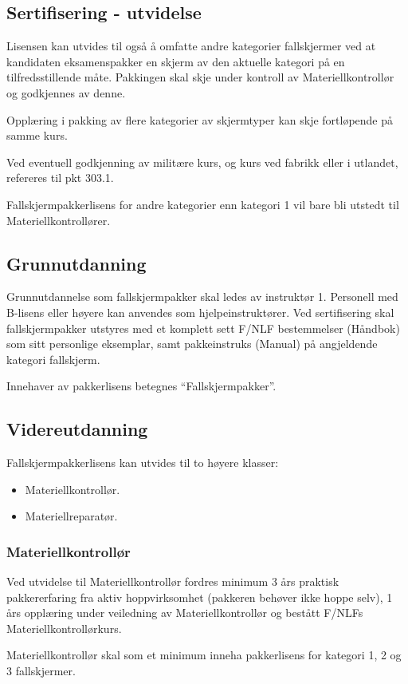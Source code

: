 \subsection{Sertifisering - utvidelse}
Lisensen kan utvides til også å omfatte andre kategorier fallskjermer ved at kandidaten eksamenspakker en skjerm av den aktuelle kategori på en tilfredsstillende måte. Pakkingen skal skje under kontroll av Materiellkontrollør og godkjennes av denne.

Opplæring i pakking av flere kategorier av skjermtyper kan skje fortløpende på samme kurs.

Ved eventuell godkjenning av militære kurs, og kurs ved fabrikk eller i utlandet, refereres til pkt 303.1.

Fallskjermpakkerlisens for andre kategorier enn kategori 1 vil bare bli utstedt til Materiellkontrollører.

\subsection{Grunnutdanning}
Grunnutdannelse som fallskjermpakker skal ledes av instruktør 1. Personell med B-lisens eller høyere kan anvendes som hjelpeinstruktører. Ved sertifisering skal fallskjermpakker utstyres med et komplett sett F/NLF bestemmelser (Håndbok) som sitt personlige eksemplar, samt pakkeinstruks (Manual) på angjeldende kategori fallskjerm.

Innehaver av pakkerlisens betegnes ``Fallskjermpakker''.

\subsection{Videreutdanning}
Fallskjermpakkerlisens kan utvides til to høyere klasser:
\begin{itemize}
	\item Materiellkontrollør.
	\item Materiellreparatør.
\end{itemize}

\subsubsection{Materiellkontrollør}
Ved utvidelse til Materiellkontrollør fordres minimum 3 års praktisk pakkererfaring fra aktiv hoppvirksomhet (pakkeren behøver ikke hoppe selv), 1 års opplæring under veiledning av Materiellkontrollør og bestått F/NLFs Materiellkontrollørkurs.

Materiellkontrollør skal som et minimum inneha pakkerlisens for kategori 1, 2 og 3 fallskjermer.

